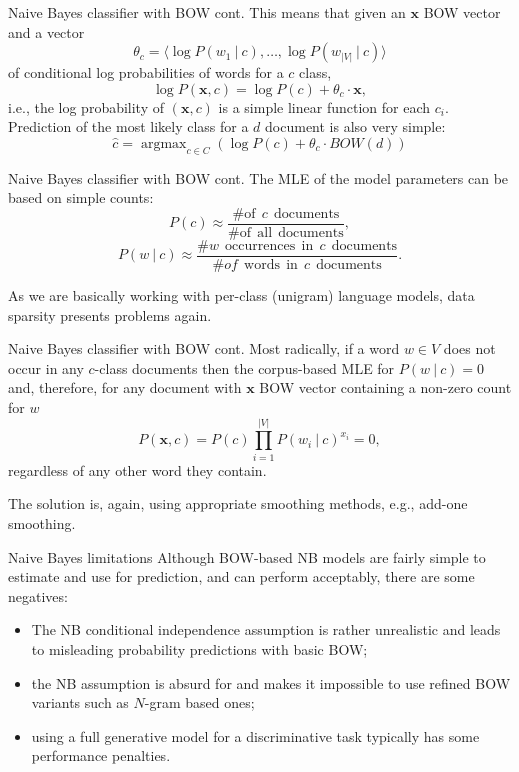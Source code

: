 \documentclass[style=upen, size=14pt]{powerdot}
\DeclareMathOperator*{\argmax}{argmax}
\theoremstyle{definition}
\begin{document}
 \begin{slide}[toc=]{Naive Bayes classifier with BOW cont.}
   This means that given an $\mathbf{x}$ BOW vector and a vector
   $$\theta_c=\langle \log P(w_1~\vert~c),\dots,\log P(w_{|V|}~\vert~c) \rangle$$
   of conditional log probabilities of words for a $c$ class,
   $$\log P(\mathbf{x}, c) = \log P(c) +  \theta_c \cdot \mathbf{x},$$
   i.e., the log probability of $(\mathbf{x}, c)$ is a simple linear function
   for each $c_i$. Prediction of the most likely class for a $d$ document is also
   very simple:
   $$
   \hat c = \argmax_{c\in C}(\log P(c) + \theta_{c}  \cdot BOW(d) )
   $$
 \end{slide}

 \begin{slide}[toc=]{Naive Bayes classifier with BOW cont.}
   The MLE of the model parameters can be based on simple counts:
   $$
   P(c) \approx \frac{\# \mathrm{of}~~c~~\mathrm{documents}}{ \# \mathrm{of~~all~~documents}},
   $$
   $$
   P(w~|~c) \approx \frac{\# w~~\mathrm{occurrences~~in}~~c~~\mathrm{documents}}{\# of~~\mathrm{words~~in}~~c~~\mathrm{documents}}.
   $$\smallskip
   
   As we are basically working with per-class (unigram) language models, data
   sparsity presents problems again.
 \end{slide}

 \begin{slide}[toc=]{Naive Bayes classifier with BOW cont.}
   Most radically, if a word $w\in V$ does not occur in any $c$-class documents
   then the corpus-based MLE for $P(w~|~c)=0$ and, therefore, for any document
   with $\mathbf{x}$ BOW vector containing a non-zero count for  $w$
   $$
   P(\mathbf{x}, c) = P(c) \prod_{i=1}^{|V|}P(w_i~\vert~c)^{x_i}=0,
   $$
   regardless of any other word they contain.

   The solution is, again, using appropriate smoothing methods, e.g., add-one
   smoothing.
 \end{slide}

 \begin{slide}[toc=]{Naive Bayes limitations}
   Although BOW-based NB models are fairly simple to estimate and use for
   prediction, and can perform acceptably, there are some negatives:
   \begin{itemize}
   \item The NB conditional independence assumption is rather unrealistic and
     leads to misleading probability predictions with basic BOW;
   \item the NB assumption is absurd for and makes it impossible to use refined
     BOW variants such as $N$-gram based ones;
   \item using a full generative model for a discriminative task typically has
     some performance penalties.
   \end{itemize}
 \end{slide}
\end{document}
